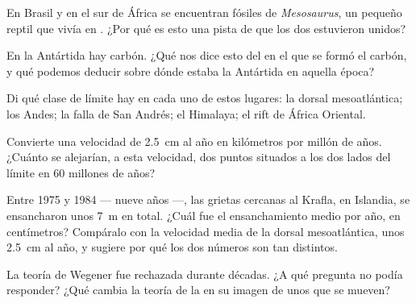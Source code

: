 \begin{exercise}[$\star$]\label{exo:g7:plate-tectonics:4}
En Brasil y en el sur de África se encuentran fósiles de \emph{Mesosaurus},
un pequeño reptil que vivía en . ¿Por qué es esto una pista de que
los dos  estuvieron unidos?
\end{exercise}

\begin{exercise}[$\star\star$]\label{exo:g7:plate-tectonics:5}
En la Antártida hay carbón. ¿Qué nos dice esto del  en el que se formó
el carbón, y qué podemos deducir sobre dónde estaba la Antártida en aquella
época?
\end{exercise}

\begin{exercise}[$\star\star$]\label{exo:g7:plate-tectonics:6}
Di qué clase de límite hay en cada uno de estos lugares: la dorsal
mesoatlántica; los Andes; la falla de San Andrés; el Himalaya; el rift de
África Oriental.
\end{exercise}

\begin{exercise}[$\star\star$]\label{exo:g7:plate-tectonics:7}
Convierte una velocidad de \qty{2.5}{cm} al año en kilómetros por millón de
años. ¿Cuánto se alejarían, a esta velocidad, dos puntos situados a los dos
lados del límite en 60 millones de años?
\end{exercise}

\begin{exercise}[$\star\star$]\label{exo:g7:plate-tectonics:8}
Entre 1975 y 1984 --- nueve años ---, las grietas cercanas al  Krafla,
en Islandia, se ensancharon unos \qty{7}{m} en total. ¿Cuál fue el
ensanchamiento medio por año, en centímetros? Compáralo con la velocidad
media de la dorsal mesoatlántica, unos \qty{2.5}{cm} al año, y sugiere por
qué los dos números son tan distintos.
\end{exercise}

\begin{exercise}[$\star\star$]\label{exo:g7:plate-tectonics:9}
La teoría de Wegener fue rechazada durante décadas. ¿A qué pregunta no
podía responder? ¿Qué cambia la teoría de la  en su
imagen de unos  que se mueven?
\end{exercise}

